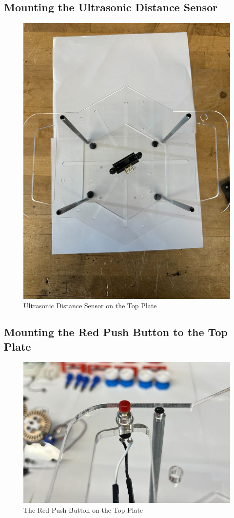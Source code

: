 \documentclass{article}
\begin{document}
\subsection{Mounting the Ultrasonic Distance Sensor}
\begin{figure}[H]
    \centering
    \includegraphics[width=0.5\linewidth]{PCBImages/Frame/ultrasonic-distance-on-top-plate.jpg}
    \caption{Ultrasonic Distance Sensor on the Top Plate}
    \label{fig:ultrasonic_on_top_plate}
\end{figure}

\subsection{Mounting the Red Push Button to the Top Plate}
\begin{figure}[H]
    \centering
    \includegraphics[width=0.5\linewidth]{PCBImages/Frame/frame_5.jpg}
    \caption{The Red Push Button on the Top Plate}
    \label{fig:red_button_on_top_plate}
\end{figure}
\end{document}
